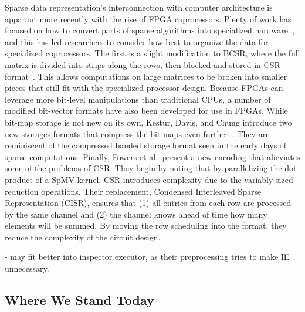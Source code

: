 Sparse data representation's interconnection with computer architecture is apparant more recently with the rise of FPGA coprocessors. 
Plenty of work has focused on how to convert parts of sparse algorithms into specialized hardware~\cite{elgindy2002sparse,zhuo2005sparse,gregg2007fpga,prasanna2007sparse,jain2020domain,kapre2009parallelizing}, and this has led researchers to consider how best to organize the data for specialized coprocessors. 
The first is a slight modification to BCSR, where the full matrix is divided into strips along the rows, then blocked and stored in CSR format~\cite{sun2007sparse}. 
This allows computations on large matrices to be broken into smaller pieces that still fit with the specialized processor design.
Because FPGAs can leverage more bit-level manipulations than traditional CPUs, a number of modified bit-vector formats have also been developed for use in FPGAs. 
While bit-map storage is not new on its own, Kestur, Davis, and Chung introduce two new storages formats that compress the bit-maps even further~\cite{kestur2012towards}.
They are reminiscent of the compressed banded storage format seen in the early days of sparse computations.
Finally, Fowers et al~\cite{fowers2014high} present a new encoding that alieviates some of the problems of CSR.
They begin by noting that by parallelizing the dot product of a SpMV kernel, CSR introduces complexity due to the variably-sized reduction operations.
Their replacement, Condensed Interleaved Sparse Representation (CISR), ensures that (1) all entries from each row are processed by the same channel and (2) the channel knows ahead of time how many elements will be summed.
By moving the row scheduling into the format, they reduce the complexity of the circuit design.






\cite{im2001optimizing}
\cite{im2004sparsity}

\cite{vuduc2005oski}
\cite{choi2010model}


\cite{chang1997towards}
\cite{lujan2005storage}


\cite{fu1996run}
\cite{ujaldon1996parallelization}
- may fit better into inspector executor, as their preprocessing tries to make IE unnecessary.


\subsection{Where We Stand Today}





